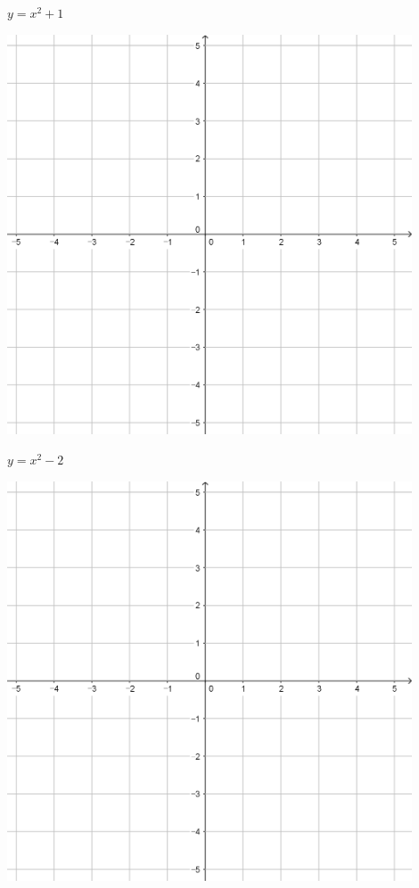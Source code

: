 \documentclass[a4paper]{oblivoir}
\begin{document}
\begin{minipage}{0.45\textwidth}\centering
\(y=x^2+1\)
\par\bigskip\includegraphics[width=0.9\textwidth]{55}
\end{minipage}
\begin{minipage}{0.45\textwidth}\centering
\(y=x^2-2\)
\par\bigskip\includegraphics[width=0.9\textwidth]{55}
\end{minipage}\bigskip\bigskip\par
\end{document}
